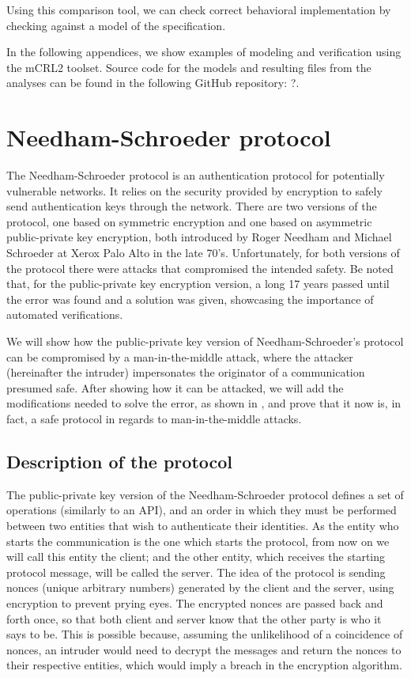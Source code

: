 \documentclass[11pt]{article}
\theoremstyle{definition}
\theoremstyle{plain}
\theoremstyle{definition}
\begin{document}
Using this comparison tool, we can check correct behavioral implementation by checking against a model of the specification. 
\newpage
\begin{appendices}
In the following appendices, we show examples of modeling and verification using the mCRL2 toolset. Source code for the models and resulting files from the analyses can be found in the following GitHub repository: ?.
\section{Needham-Schroeder protocol}
The Needham-Schroeder protocol is an authentication protocol for potentially vulnerable networks. It relies on the security provided by encryption to safely send authentication keys through the network. There are two versions of the protocol, one based on symmetric encryption and one based on asymmetric public-private key encryption, both introduced by Roger Needham and Michael Schroeder at Xerox Palo Alto in the late 70's\cite{Needham:1978:UEA:359657.359659}. Unfortunately, for both versions of the protocol there were attacks that compromised the intended safety\cite{Denning:1981:TKD:358722.358740}\cite{Lowe:1995:ANP:219887.219895}. Be noted that, for the public-private key encryption version, a long 17 years passed until the error was found and a solution was given, showcasing the importance of automated verifications. 

We will show how the public-private key version of Needham-Schroeder's protocol can be compromised by a man-in-the-middle attack, where the attacker (hereinafter the intruder) impersonates the originator of a communication presumed safe. After showing how it can be attacked, we will add the modifications needed to solve the error, as shown in \cite{Lowe:1995:ANP:219887.219895}, and prove that it now is, in fact, a safe protocol in regards to man-in-the-middle attacks.

\subsection{Description of the protocol}

The public-private key version of the Needham-Schroeder protocol defines a set of operations (similarly to an API), and an order in which they must be performed between two entities that wish to authenticate their identities. As the entity who starts the communication is the one which starts the protocol, from now on we will call this entity the client; and the other entity, which receives the starting protocol message, will be called the server. The idea of the protocol is sending nonces (unique arbitrary numbers) generated by the client and the server, using encryption to prevent prying eyes. The encrypted nonces are passed back and forth once, so that both client and server know that the other party is who it says to be. This is possible because, assuming the unlikelihood of a coincidence of nonces, an intruder would need to decrypt the messages and return the nonces to their respective entities, which would imply a breach in the encryption algorithm.


\end{appendices}
\end{document}

